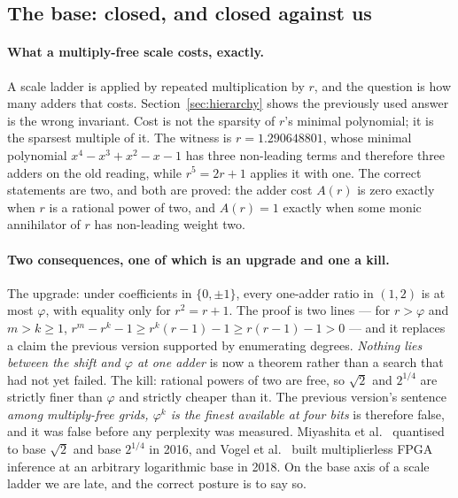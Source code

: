 \documentclass[11pt]{article}
\theoremstyle{definition}
\begin{document}
\subsection*{The base: closed, and closed against us}

\paragraph{What a multiply-free scale costs, exactly.} A scale ladder is
applied by repeated multiplication by $r$, and the question is how many adders
that costs. Section~\ref{sec:hierarchy} shows the previously used answer is the
wrong invariant. Cost is not the sparsity of $r$'s minimal polynomial; it is
the sparsest multiple of it. The witness is $r = 1.290648801$, whose minimal
polynomial $x^{4}-x^{3}+x^{2}-x-1$ has three non-leading terms and therefore
three adders on the old reading, while $r^{5} = 2r+1$ applies it with one. The
correct statements are two, and both are proved: the adder cost $A(r)$ is zero
exactly when $r$ is a rational power of two, and $A(r)=1$ exactly when some
monic annihilator of $r$ has non-leading weight two.

\paragraph{Two consequences, one of which is an upgrade and one a kill.} The
upgrade: under coefficients in $\{0,\pm1\}$, every one-adder ratio in $(1,2)$
is at most $\varphi$, with equality only for $r^{2}=r+1$. The proof is two
lines --- for $r>\varphi$ and $m>k\geq 1$, $r^{m}-r^{k}-1 \geq r^{k}(r-1)-1
\geq r(r-1)-1 > 0$ --- and it replaces a claim the previous version supported
by enumerating degrees. \emph{Nothing lies between the shift and $\varphi$ at
one adder} is now a theorem rather than a search that had not yet failed. The
kill: rational powers of two are free, so $\sqrt{2}$ and $2^{1/4}$ are strictly
finer than $\varphi$ and strictly cheaper than it. The previous version's
sentence \emph{among multiply-free grids, $\varphi^{k}$ is the finest available
at four bits} is therefore false, and it was false before any perplexity was
measured. Miyashita et al.~\cite{miyashita} quantised to base $\sqrt{2}$ and
base $2^{1/4}$ in 2016, and Vogel et al.~\cite{vogel} built multiplierless
FPGA inference at an arbitrary logarithmic base in 2018. On the base axis of a
scale ladder we are late, and the correct posture is to say so.
\end{document}
